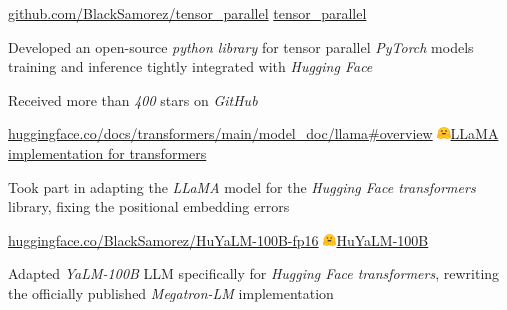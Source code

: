 
\begin{cventries}
  \cventry
    {\href{https://github.com/BlackSamorez/tensor_parallel}{\url{github.com/BlackSamorez/tensor_parallel}}} %
    {\faGithub\acvHeaderIconSep\href{https://github.com/BlackSamorez/tensor_parallel}{tensor\_parallel}} %
    {} %
    {} %
    {
      \begin{cvitems} %
        \item { Developed an open-source \textit{python library} for tensor parallel \textit{PyTorch} models training and inference tightly integrated with \textit{Hugging Face} }
        \item { Received more than \textit{400} stars on \textit{GitHub} }
      \end{cvitems}
    }

  \cventry
    {\href{https://huggingface.co/docs/transformers/main/model_doc/llama\#overview}{\url{huggingface.co/docs/transformers/main/model_doc/llama\#overview}}} %
    {\includegraphics[width=3.5mm]{hf.jpg}\acvHeaderIconSep\href{https://huggingface.co/docs/transformers/main/model_doc/llama}{LLaMA implementation for transformers}} %
    {} %
    {} %
    {
      \begin{cvitems} %
        \item {Took part in adapting the \textit{LLaMA} model for the \textit{Hugging Face transformers} library, fixing the positional embedding errors}
      \end{cvitems}
    }

  \cventry
    {\href{https://huggingface.co/BlackSamorez/HuYaLM-100B-fp16}{\url{huggingface.co/BlackSamorez/HuYaLM-100B-fp16}}} %
    {\includegraphics[width=3.5mm]{hf.jpg}\acvHeaderIconSep\href{https://huggingface.co/BlackSamorez/HuYaLM-100B-fp16}{HuYaLM-100B}} %
    {} %
    {} %
    {
      \begin{cvitems} %
        \item { Adapted \textit{YaLM-100B} LLM specifically for \textit{Hugging Face transformers}, rewriting the officially published \textit{Megatron-LM} implementation }
      \end{cvitems}
    }
    

\end{cventries}

